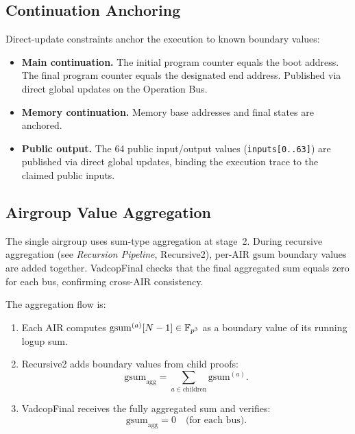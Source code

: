 \subsection{Continuation Anchoring}
\label{sec:continuation}

Direct-update constraints anchor the execution to known boundary values:

\begin{itemize}[nosep]
  \item \textbf{Main continuation.}
        The initial program counter equals the boot address.
        The final program counter equals the designated end address.
        Published via direct global updates on the Operation Bus.

  \item \textbf{Memory continuation.}
        Memory base addresses and final states are anchored.

  \item \textbf{Public output.}
        The 64 public input/output values (\texttt{inputs[0..63]}) are
        published via direct global updates, binding the execution trace
        to the claimed public inputs.
\end{itemize}

\subsection{Airgroup Value Aggregation}
\label{sec:agg-values}

The single airgroup uses sum-type aggregation at stage~2.
During recursive aggregation (see \emph{Recursion Pipeline}, Recursive2),
per-AIR $\mathrm{gsum}$ boundary values are added together.
VadcopFinal checks that the final aggregated sum equals zero
for each bus, confirming cross-AIR consistency.

The aggregation flow is:
\begin{enumerate}[nosep]
  \item Each AIR computes $\mathrm{gsum}^{(a)}[N-1] \in \mathbb{F}_{p^3}$
        as a boundary value of its running logup sum.
  \item Recursive2 adds boundary values from child proofs:
        \[
          \mathrm{gsum}_{\mathrm{agg}} = \sum_{a \in \mathrm{children}}
          \mathrm{gsum}^{(a)}.
        \]
  \item VadcopFinal receives the fully aggregated sum and verifies:
        \[
          \mathrm{gsum}_{\mathrm{agg}} = 0 \quad\text{(for each bus)}.
        \]
\end{enumerate}
